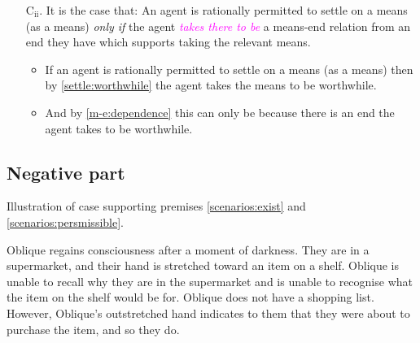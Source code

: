 \documentclass[10pt]{article}
\newcommand{\hozlinedash}[0]{%
  \noindent\hdashrule[0.5ex][c]{\textwidth}{.1pt}{2.5pt}
}
\begin{document}
\begin{enumerate}[label=\arabic*., ref=(\arabic*)]
\item[C\(_{\text{ii}}\).]\label{together} It is the case that:
  An agent is rationally permitted to settle on a means (as a means) \emph{only if} the agent \textcolor{fuchsia}{\emph{takes there to be}} a means-end relation from an end they have which supports taking the relevant means.
  \begin{itemize}
  \item If an agent is rationally permitted to settle on a means (as a means) then by \ref{settle:worthwhile} the agent takes the means to be worthwhile.
  \item And by \ref{m-e:dependence} this can only be because there is an end the agent takes to be worthwhile.
  \end{itemize}
\end{enumerate}

\newpage


\subsection{Negative part}
\label{sec:negative-part}


Illustration of case supporting premises \ref{scenarios:exist} and \ref{scenarios:persmissible}.

\hozlinedash





\hozlinedash

\begin{scenario}[Supermarket]
  Oblique regains consciousness after a moment of darkness.
  They are in a supermarket, and their hand is stretched toward an item on a shelf.
  Oblique is unable to recall why they are in the supermarket and is unable to recognise what the item on the shelf would be for.
  Oblique does not have a shopping list.
  However, Oblique's outstretched hand indicates to them that they were about to purchase the item, and so they do.
\end{scenario}
\end{document}
